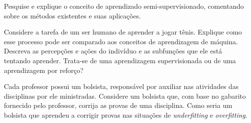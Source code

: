 \begin{exercise}
Pesquise e explique o conceito de aprendizado semi-supervisionado, comentando sobre os métodos existentes e suas aplicações.
\end{exercise}

\begin{exercise}
Considere a tarefa de um ser humano de aprender a jogar tênis. Explique como esse processo pode ser comparado aos conceitos de aprendizagem de máquina. Descreva as percepções e ações do indivíduo e as subfunções que ele está tentando aprender. Trata-se de uma aprendizagem supervisionada ou de uma aprendizagem por reforço?
\end{exercise}

\begin{exercise}
Cada professor possui um bolsista, responsável por auxiliar nas atividades das disciplinas por ele ministradas. Considere um bolsista que, com base no gabarito fornecido pelo professor, corrija as provas de uma disciplina. Como seria um bolsista que aprendeu a corrigir provas nas situações de \textit{underfitting} e \textit{overfitting}.
\end{exercise}